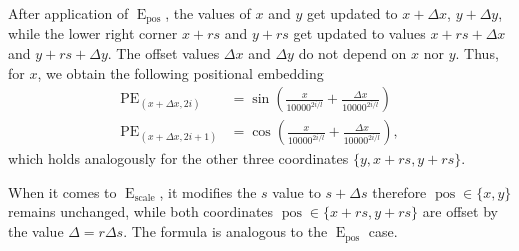 \documentclass{article}
\newtheorem{lemma}{Lemma}
\DeclareMathOperator{\E}{E}
\DeclareMathOperator{\scale}{scale}
\DeclareMathOperator{\pos}{pos}
\DeclareMathOperator{\PE}{PE}
\begin{document}
After application of $\E_{\pos}$, the values of $x$ and $y$ get updated to $x+ \Delta x$, $y+\Delta y$, while the lower right corner $x+rs$ and $y+rs$ get updated to values $x + rs + \Delta x$ and $y + rs + \Delta y$. The offset values $\Delta x$ and $\Delta y$ do not depend on $x$ nor $y$. Thus, for $x$, we obtain the following positional embedding
\begin{align*}
    \PE_{(x + \Delta x,2i)} &= \sin\left(\frac{x}{10000^{2i/l}} + \frac{\Delta x}{10000^{2i/l}}\right) \\
    \PE_{(x + \Delta x,2i+1)} &= \cos\left(\frac{x}{10000^{2i/l}} + \frac{\Delta x}{10000^{2i/l}}\right),
\end{align*}
which holds analogously for the other three coordinates $\{y, x+rs, y+rs\}$.

When it comes to $\E_{\scale}$, it modifies the $s$ value to $s + \Delta s$ therefore $\pos \in \{x, y\}$ remains unchanged, while both coordinates $\pos \in \{x + rs, y + rs\}$ are offset by the value $\Delta = r\Delta s$. The formula is analogous to the $\E_{\pos}$ case.




\end{document}
